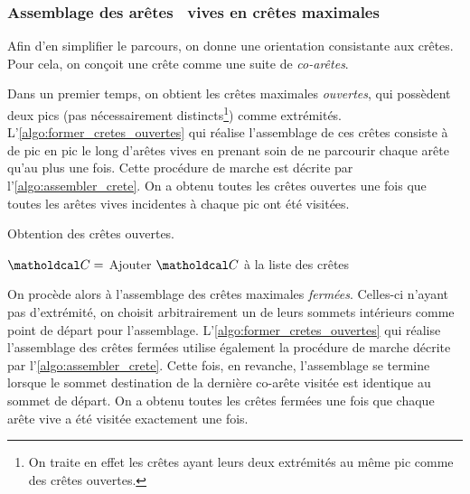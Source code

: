 \subsubsection{Assemblage des arêtes \brep\ vives en crêtes maximales}
Afin d'en simplifier le parcours, on donne une orientation consistante aux crêtes. 
Pour cela, on conçoit une crête comme une suite de \textit{co-arêtes}.
\par
Dans un premier temps, on obtient les crêtes maximales \textit{ouvertes}, \ie qui possèdent deux pics (pas nécessairement distincts\footnote{On traite en effet les crêtes ayant leurs deux extrémités au même pic comme des crêtes ouvertes.}) comme extrémités. 
L'\autoref{algo:former_cretes_ouvertes} qui réalise l'assemblage de ces crêtes consiste à  de pic en pic le long d'arêtes vives en prenant soin de ne parcourir chaque arête qu'au plus une fois. 
Cette procédure de marche est décrite par l'\autoref{algo:assembler_crete}. 
On a obtenu toutes les crêtes ouvertes une fois que toutes les arêtes vives incidentes à chaque pic ont été visitées. 


\begin{algorithm}
	\caption{Obtention des crêtes ouvertes.}\label{algo:former_cretes_ouvertes}
	\begin{algorithmic}[1]
					\State $\crete = $ 
					\State Ajouter $\crete$ à la liste des crêtes
				\EndFor
			\EndFor
	\end{algorithmic}
\end{algorithm}

\par
On procède alors à l'assemblage des crêtes maximales \textit{fermées}. 
Celles-ci n'ayant pas d'extrémité, on choisit arbitrairement un de leurs sommets intérieurs comme point de départ pour l'assemblage. 
L'\autoref{algo:former_cretes_ouvertes} qui réalise l'assemblage des crêtes fermées utilise également la procédure de marche décrite par l'\autoref{algo:assembler_crete}. 
Cette fois, en revanche, l'assemblage se termine lorsque le sommet destination de la dernière co-arête visitée est identique au sommet de départ. 
On a obtenu toutes les crêtes fermées une fois que chaque arête vive a été visitée exactement une fois. 


